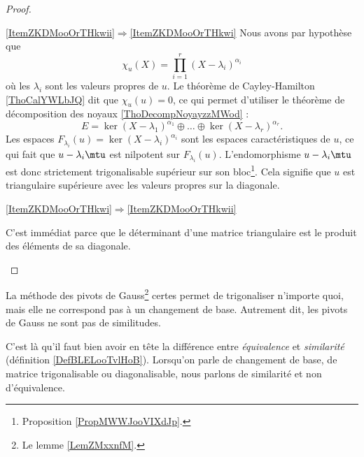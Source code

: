 \begin{proof}
    \begin{subproof}
        \item[\ref{ItemZKDMooOrTHkwii}\( \Rightarrow\)\ref{ItemZKDMooOrTHkwi}]
            Nous avons par hypothèse que
            \begin{equation}
                \chi_u(X)=\prod_{i=1}^r(X-\lambda_i)^{\alpha_i}
            \end{equation}
            où les \( \lambda_i\) sont les valeurs propres de \( u\). Le théorème de Cayley-Hamilton \ref{ThoCalYWLbJQ} dit que \( \chi_u(u)=0\), ce qui permet d'utiliser le théorème de décomposition des noyaux \ref{ThoDecompNoyayzzMWod} :
            \begin{equation}
                E=\ker(X-\lambda_1)^{\alpha_1}\oplus\ldots\oplus\ker(X-\lambda_r)^{\alpha_r}.
            \end{equation}
            Les espaces \( F_{\lambda_i}(u)=\ker(X-\lambda_i)^{\alpha_i}\) sont les espaces caractéristiques de \( u\), ce qui fait que \( u-\lambda_i\mtu\) est nilpotent sur \( F_{\lambda_i}(u)\). L'endomorphisme \( u-\lambda_i\mtu\) est donc strictement trigonalisable supérieur sur son bloc\footnote{Proposition \ref{PropMWWJooVIXdJp}.}. Cela signifie que \( u\) est triangulaire supérieure avec les valeurs propres sur la diagonale.

        \item[\ref{ItemZKDMooOrTHkwi}\( \Rightarrow\)\ref{ItemZKDMooOrTHkwii}]

            C'est immédiat parce que le déterminant d'une matrice triangulaire est le produit des éléments de sa diagonale.
    \end{subproof}
\end{proof}

\begin{remark}
    La méthode des pivots de Gauss\footnote{Le lemme \ref{LemZMxxnfM}.} certes permet de trigonaliser n'importe quoi, mais elle ne correspond pas à un changement de base. Autrement dit, les pivots de Gauss ne sont pas de similitudes.

    C'est là qu'il faut bien avoir en tête la différence entre \emph{équivalence} et \emph{similarité} (définition \ref{DefBLELooTvlHoB}). Lorsqu'on parle de changement de base, de matrice trigonalisable ou diagonalisable, nous parlons de similarité et non d'équivalence.
\end{remark}

